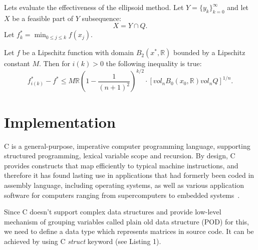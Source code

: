 \documentclass[runningheads,a4paper]{llncs}
\begin{document}

Lets evaluate the effectiveness of the ellipsoid method. Let $Y=\{y_k\}^\infty_{k=0}$ and let $X$ be a feasible part of $Y$ subsequence: $$X=Y\cap Q.$$ Let $f^*_k=\min_{0\leq j\leq k}f(x_j)$.

\begin{theorem}
\proof\cite{nesterov}
Let $f$ be a Lipschitz function with domain $B_2(x^*,\mathbb{R})$ bounded by a Lipschitz constant $M$. Then for $i(k)>0$ the following inequality is true: $$f^*_{i(k)}-f^*\leq M\mathbb{R}\left(1-\frac{1}{(n+1)^2}\right)^{k/2}\cdot\left[vol_nB_0(x_0,\mathbb{R})vol_nQ\right]^{1/n}.$$
\end{theorem}


\section{Implementation}

C is a general-purpose, imperative computer programming language, supporting structured programming, lexical variable scope and recursion. By design, C provides constructs that map efficiently to typical machine instructions, and therefore it has found lasting use in applications that had formerly been coded in assembly language, including operating systems, as well as various application software for computers ranging from supercomputers to embedded systems~\cite{kern}.

Since C doesn't support complex data structures and provide low-level mechanism of grouping variables called plain old data structure (POD) for this, we need to define a data type which represents matrices in source code. It can be achieved by using C \textit{struct} keyword (see Listing 1).
\end{document}
